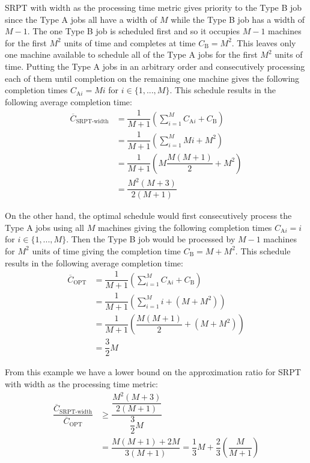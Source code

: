 SRPT with width as the processing time metric gives priority to the Type B job since the Type A jobs all have a width of $M$ while the Type B job has a width of $M-1$.
The one Type B job is scheduled first and so it occupies $M-1$ machines for the first $M^2$ units of time and completes at time $C_\text{B}=M^2$.
This leaves only one machine available to schedule all of the Type A jobs for the first $M^2$ units of time.
Putting the Type A jobs in an arbitrary order and consecutively processing each of them until completion on the remaining one machine gives the following completion times $C_{\text{A}i}=Mi$ for $i\in\{1,...,M\}$.
This schedule results in the following average completion time:
\begin{align}
	\overline{C}_\text{SRPT-width} & = \dfrac{1}{M+1}\left(\sum_{i=1}^M C_{\text{A}i} + C_\text{B}\right) \nonumber \\
	& = \dfrac{1}{M+1}\left(\sum_{i=1}^M Mi + M^2\right) \nonumber \\
	& = \dfrac{1}{M+1}\left(M\dfrac{M(M+1)}{2} + M^2\right) \nonumber \\
	& = \dfrac{M^2(M+3)}{2(M+1)}
\end{align}

On the other hand, the optimal schedule would first consecutively process the Type A jobs using all $M$ machines giving the following completion times $C_{\text{A}i}=i$ for $i\in\{1,...,M\}$.
Then the Type B job would be processed by $M-1$ machines for $M^2$ units of time giving the completion time $C_\text{B}=M+M^2$.
This schedule results in the following average completion time:
\begin{align}
	\overline{C}_\text{OPT} & = \dfrac{1}{M+1}\left(\sum_{i=1}^M C_{\text{A}i} + C_\text{B}\right) \nonumber \\
	& = \dfrac{1}{M+1}\left(\sum_{i=1}^M i + (M + M^2)\right) \nonumber \\
	& = \dfrac{1}{M+1}\left(\dfrac{M(M+1)}{2} + (M + M^2)\right) \nonumber \\
	& = \dfrac{3}{2}M
\end{align}

From this example we have a lower bound on the approximation ratio for SRPT with width as the processing time metric:
\begin{align}
	\dfrac{\overline{C}_\text{SRPT-width}}{\overline{C}_\text{OPT}} & \geq \dfrac{\dfrac{M^2(M+3)}{2(M+1)}}{\dfrac{3}{2}M} \nonumber \\
	& = \dfrac{M(M+1)+2M}{3(M+1)} = \dfrac{1}{3}M + \dfrac{2}{3}\left(\dfrac{M}{M+1}\right)
\end{align}

